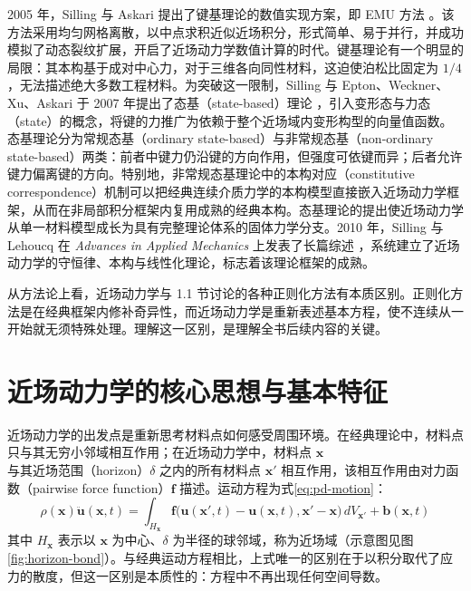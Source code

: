 2005 年，Silling 与 Askari 提出了键基理论的数值实现方案，即 EMU 方法 \cite{SillingAskari2005}。该方法采用均匀网格离散，以中点求积近似近场积分，形式简单、易于并行，并成功模拟了动态裂纹扩展，开启了近场动力学数值计算的时代。键基理论有一个明显的局限：其本构基于成对中心力，对于三维各向同性材料，这迫使泊松比固定为 $1/4$ \cite{SillingAskari2005}，无法描述绝大多数工程材料。为突破这一限制，Silling 与 Epton、Weckner、Xu、Askari 于 2007 年提出了态基（state-based）理论 \cite{Silling2007}，引入变形态与力态（state）的概念，将键的力推广为依赖于整个近场域内变形构型的向量值函数。态基理论分为常规态基（ordinary state-based）与非常规态基（non-ordinary state-based）两类：前者中键力仍沿键的方向作用，但强度可依键而异；后者允许键力偏离键的方向。特别地，非常规态基理论中的本构对应（constitutive correspondence）机制可以把经典连续介质力学的本构模型直接嵌入近场动力学框架，从而在非局部积分框架内复用成熟的经典本构。态基理论的提出使近场动力学从单一材料模型成长为具有完整理论体系的固体力学分支。2010 年，Silling 与 Lehoucq 在 \textit{Advances in Applied Mechanics} 上发表了长篇综述 \cite{SillingLehoucq2010}，系统建立了近场动力学的守恒律、本构与线性化理论，标志着该理论框架的成熟。

\begin{remark}
  从方法论上看，近场动力学与 1.1 节讨论的各种正则化方法有本质区别。正则化方法是在经典框架内修补奇异性，而近场动力学是重新表述基本方程，使不连续从一开始就无须特殊处理。理解这一区别，是理解全书后续内容的关键。
\end{remark}

\section{近场动力学的核心思想与基本特征}

近场动力学的出发点是重新思考材料点如何感受周围环境。在经典理论中，材料点只与其无穷小邻域相互作用；在近场动力学中，材料点 $\mathbf{x}$ 与其近场范围（horizon）$\delta$ 之内的所有材料点 $\mathbf{x}'$ 相互作用，该相互作用由对力函数（pairwise force function）$\mathbf{f}$ 描述。运动方程为式\eqref{eq:pd-motion}：
\begin{equation}
  \rho(\mathbf{x})\ddot{\mathbf{u}}(\mathbf{x},t)=\int_{H_{\mathbf{x}}}\mathbf{f}\big(\mathbf{u}(\mathbf{x}',t)-\mathbf{u}(\mathbf{x},t),\mathbf{x}'-\mathbf{x}\big)\,dV_{\mathbf{x}'}+\mathbf{b}(\mathbf{x},t)
  \label{eq:pd-motion}
\end{equation}
其中 $H_{\mathbf{x}}$ 表示以 $\mathbf{x}$ 为中心、$\delta$ 为半径的球邻域，称为近场域（示意图见图\ref{fig:horizon-bond}）。与经典运动方程相比，上式唯一的区别在于以积分取代了应力的散度，但这一区别是本质性的：方程中不再出现任何空间导数。

